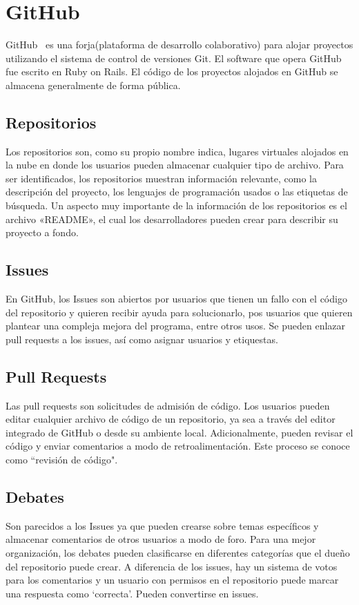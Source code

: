 \documentclass[a4paper, 12pt]{book}
\begin{document}
\section{GitHub}
\label{sec:GitHub}

GitHub~\cite{website:GitHub} es una forja(plataforma de desarrollo colaborativo) para alojar proyectos utilizando el sistema de control de versiones Git. El software que opera GitHub fue escrito en Ruby on Rails. El código de los proyectos alojados en GitHub se almacena generalmente de forma pública.

\subsection{Repositorios}

Los repositorios son, como su propio nombre indica, lugares virtuales alojados en la nube en donde los usuarios pueden almacenar cualquier tipo de archivo. Para ser identificados, los repositorios muestran información relevante, como la descripción del proyecto, los lenguajes de programación usados o las etiquetas de búsqueda. Un aspecto muy importante de la información de los repositorios es el archivo «README», el cual los desarrolladores pueden crear para describir su proyecto a fondo.

\subsection{Issues}

En GitHub, los Issues son abiertos por usuarios que tienen un fallo con el código del repositorio y quieren recibir ayuda para solucionarlo, pos usuarios que quieren plantear una compleja mejora del programa, entre otros usos. Se pueden enlazar pull requests a los issues, así como asignar usuarios y etiquestas.

\subsection{Pull Requests}

Las pull requests son solicitudes de admisión de código. Los usuarios pueden editar cualquier archivo de código de un repositorio, ya sea a través del editor integrado de GitHub o desde su ambiente local. Adicionalmente, pueden revisar el código y enviar comentarios a modo de retroalimentación. Este proceso se conoce como ``revisión de código".

\subsection{Debates}
Son parecidos a los Issues ya que pueden crearse sobre temas específicos y almacenar comentarios de otros usuarios a modo de foro. Para una mejor organización, los debates pueden clasificarse en diferentes categorías que el dueño del repositorio puede crear. A diferencia de los issues, hay un sistema de votos para los comentarios y un usuario con permisos en el repositorio puede marcar una respuesta como `correcta'. Pueden convertirse en issues.
\end{document}
